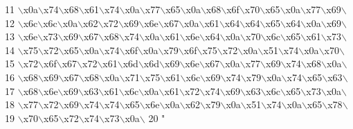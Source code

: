 \begin{DoxyCode}
11 \textcolor{stringliteral}{\(\backslash\)x0a\(\backslash\)x74\(\backslash\)x68\(\backslash\)x61\(\backslash\)x74\(\backslash\)x0a\(\backslash\)x77\(\backslash\)x65\(\backslash\)x0a\(\backslash\)x68\(\backslash\)x6f\(\backslash\)x70\(\backslash\)x65\(\backslash\)x0a\(\backslash\)x77\(\backslash\)x69\(\backslash\)}
12 \textcolor{stringliteral}{\(\backslash\)x6c\(\backslash\)x6c\(\backslash\)x0a\(\backslash\)x62\(\backslash\)x72\(\backslash\)x69\(\backslash\)x6e\(\backslash\)x67\(\backslash\)x0a\(\backslash\)x61\(\backslash\)x64\(\backslash\)x64\(\backslash\)x65\(\backslash\)x64\(\backslash\)x0a\(\backslash\)x69\(\backslash\)}
13 \textcolor{stringliteral}{\(\backslash\)x6e\(\backslash\)x73\(\backslash\)x69\(\backslash\)x67\(\backslash\)x68\(\backslash\)x74\(\backslash\)x0a\(\backslash\)x61\(\backslash\)x6e\(\backslash\)x64\(\backslash\)x0a\(\backslash\)x70\(\backslash\)x6c\(\backslash\)x65\(\backslash\)x61\(\backslash\)x73\(\backslash\)}
14 \textcolor{stringliteral}{\(\backslash\)x75\(\backslash\)x72\(\backslash\)x65\(\backslash\)x0a\(\backslash\)x74\(\backslash\)x6f\(\backslash\)x0a\(\backslash\)x79\(\backslash\)x6f\(\backslash\)x75\(\backslash\)x72\(\backslash\)x0a\(\backslash\)x51\(\backslash\)x74\(\backslash\)x0a\(\backslash\)x70\(\backslash\)}
15 \textcolor{stringliteral}{\(\backslash\)x72\(\backslash\)x6f\(\backslash\)x67\(\backslash\)x72\(\backslash\)x61\(\backslash\)x6d\(\backslash\)x6d\(\backslash\)x69\(\backslash\)x6e\(\backslash\)x67\(\backslash\)x0a\(\backslash\)x77\(\backslash\)x69\(\backslash\)x74\(\backslash\)x68\(\backslash\)x0a\(\backslash\)}
16 \textcolor{stringliteral}{\(\backslash\)x68\(\backslash\)x69\(\backslash\)x67\(\backslash\)x68\(\backslash\)x0a\(\backslash\)x71\(\backslash\)x75\(\backslash\)x61\(\backslash\)x6c\(\backslash\)x69\(\backslash\)x74\(\backslash\)x79\(\backslash\)x0a\(\backslash\)x74\(\backslash\)x65\(\backslash\)x63\(\backslash\)}
17 \textcolor{stringliteral}{\(\backslash\)x68\(\backslash\)x6e\(\backslash\)x69\(\backslash\)x63\(\backslash\)x61\(\backslash\)x6c\(\backslash\)x0a\(\backslash\)x61\(\backslash\)x72\(\backslash\)x74\(\backslash\)x69\(\backslash\)x63\(\backslash\)x6c\(\backslash\)x65\(\backslash\)x73\(\backslash\)x0a\(\backslash\)}
18 \textcolor{stringliteral}{\(\backslash\)x77\(\backslash\)x72\(\backslash\)x69\(\backslash\)x74\(\backslash\)x74\(\backslash\)x65\(\backslash\)x6e\(\backslash\)x0a\(\backslash\)x62\(\backslash\)x79\(\backslash\)x0a\(\backslash\)x51\(\backslash\)x74\(\backslash\)x0a\(\backslash\)x65\(\backslash\)x78\(\backslash\)}
19 \textcolor{stringliteral}{\(\backslash\)x70\(\backslash\)x65\(\backslash\)x72\(\backslash\)x74\(\backslash\)x73\(\backslash\)x0a\(\backslash\)}
20 \textcolor{stringliteral}{"}
\end{DoxyCode}
\hypertarget{namespacedraggabletext__rc2_a55ace7204dc0428f1f1834de1913257e}{}
